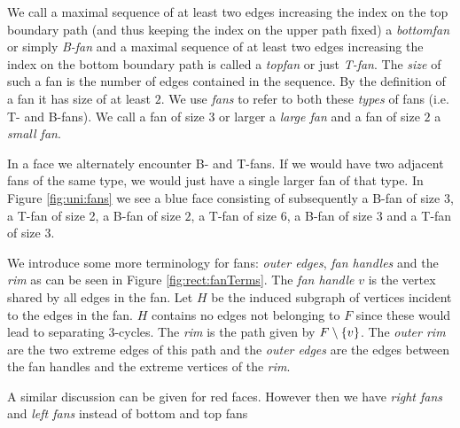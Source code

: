     We call a maximal sequence of at least two edges increasing the index on the top boundary path (and thus keeping the index on the upper path fixed) a \emph{bottomfan} or simply \emph{B-fan} and a maximal sequence of at least two edges increasing the index on the bottom boundary path is called a \emph{topfan} or just \emph{T-fan}.
    The \emph{size} of such a fan is the number of edges contained in the sequence. By the definition of a fan it has size of at least $2$.
    We use \emph{fans} to refer to both these \emph{types} of fans (i.e. T- and B-fans).
    We call a fan of size $3$ or larger a \emph{large fan} and a fan of size $2$ a \emph{small fan}.

    In a face we alternately encounter B- and T-fans. If we would have two adjacent fans of the same type, we would just have a single larger fan of that type.
    In Figure \ref{fig:uni:fans} we see a blue face consisting of subsequently a B-fan of size $3$, a T-fan of size 2, a B-fan of size $2$, a T-fan of size $6$, a B-fan of size $3$ and a T-fan of size $3$.


   We introduce some more terminology for fans: \emph{outer edges}, \emph{fan handles} and the \emph{rim} as can be seen in Figure \ref{fig:rect:fanTerms}. The \emph{fan handle} $v$ is the vertex shared by all edges in the fan. Let $H$ be the induced subgraph of vertices incident to the edges in the fan. $H$ contains no edges not belonging to $F$ since these would lead to separating 3-cycles. The \emph{rim} is the path given by $F\setminus \left\lbrace {v} \right\rbrace$.
   The \emph{outer rim} are the two extreme edges of this path and the \emph{outer edges} are the edges between the fan handles and the extreme vertices of the \emph{rim}.

   A similar discussion can be given for red faces. However then we have \emph{right fans} and \emph{left fans} instead of bottom and top fans


